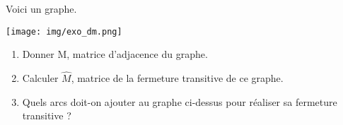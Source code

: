 \documentclass[a4paper,12pt]{book}
\begin{document}
\begin{exercice}[]
Voici un graphe.
\begin{center}
\texttt{[image: img/exo\_dm.png]}
\end{center}
\begin{enumerate}[\bfseries 1.]
	\item 	Donner M, matrice d'adjacence du graphe.
	\item 	Calculer $\widehat{M}$, matrice de la fermeture transitive de ce graphe.\\
	\item 	Quels arcs doit-on ajouter au graphe ci-dessus pour réaliser sa fermeture transitive ?
\end{enumerate}
\end{exercice}
\end{document}
